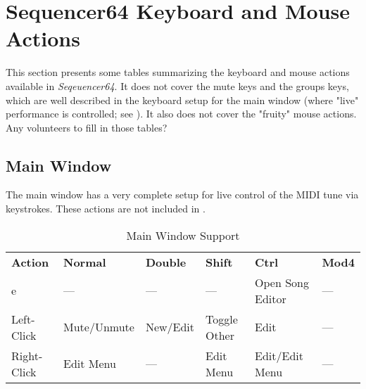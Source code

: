 %
%
%

\section{Sequencer64 Keyboard and Mouse Actions}
\label{sec:kbd_mouse_actions}

   This section presents some tables summarizing the keyboard and mouse actions
   available in \textsl{Seqeuencer64}.
   It does not cover the mute keys and the groups keys, which are well
   described in the keyboard setup for the main window (where "live"
   performance is controlled;
   see ).
   It also does not cover the "fruity" mouse actions.  Any volunteers to fill
   in those tables?

\subsection{Main Window}
\label{subsec:kbd_mouse_main_window}

   The main window has a very complete setup for live control of the MIDI tune
   via keystrokes.  These actions are not included in
   .

   \begin{table}
      \centering
      \caption{Main Window Support}
      \label{table:main_window_support}
      \begin{tabular}{l l l l l l}
         \textbf{Action}   & \textbf{Normal} & \textbf{Double}    & 
            \textbf{Shift} & \textbf{Ctrl}   & \textbf{Mod4}      \\
         e                 & ---             & ---                &
            ---            & Open Song Editor & ---               \\
         Left-Click        & Mute/Unmute     & New/Edit           &
            Toggle Other   & Edit            & ---                \\
         Right-Click       & Edit Menu       & ---                &
            Edit Menu      & Edit/Edit Menu  & ---                \\
      \end{tabular}
   \end{table}

